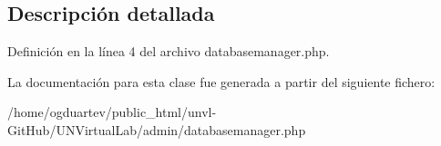 \subsection{Descripción detallada}


Definición en la línea 4 del archivo databasemanager.\+php.



La documentación para esta clase fue generada a partir del siguiente fichero\+:\begin{DoxyCompactItemize}
\item 
/home/ogduartev/public\+\_\+html/unvl-\/\+Git\+Hub/\+U\+N\+Virtual\+Lab/admin/databasemanager.\+php\end{DoxyCompactItemize}
